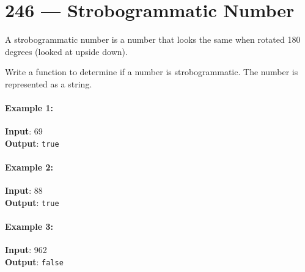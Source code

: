 \section{246 --- Strobogrammatic Number}
A strobogrammatic number is a number that looks the same when rotated 180 degrees (looked at upside down).
\par
Write a function to determine if a number is strobogrammatic. The number is represented as a string.

\paragraph{Example 1:}
\begin{flushleft}
\textbf{Input}:  69
\\
\textbf{Output}: \texttt{true}
\end{flushleft}

\paragraph{Example 2:}
\begin{flushleft}
\textbf{Input}:  88
\\
\textbf{Output}: \texttt{true}
\end{flushleft}

\paragraph{Example 3:}
\begin{flushleft}
\textbf{Input}:  962
\\
\textbf{Output}: \texttt{false}
\end{flushleft}